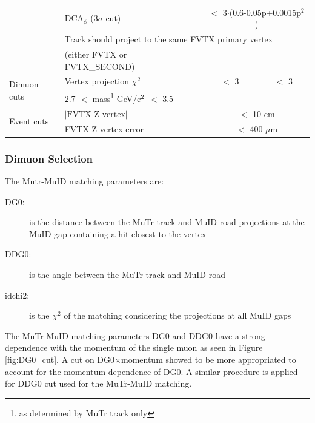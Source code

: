 \documentclass[12pt]{article}
\begin{document}
\begin{table}[!hb]
\begin{tabular}{llcc}
   	& $\textrm{DCA}_{\phi}$ (3$\sigma$ cut) & \multicolumn{2}{c}{$<$ 3$\cdot$(0.6-0.05p+0.0015p$^{2}$) } \\ 
   	& \multicolumn{3}{l}{Track should project to the same FVTX primary vertex }\\
   	& (either FVTX or FVTX\_SECOND) \\ 	
	\hline
    	\multirow{2}{*}{Dimuon cuts} 
	& Vertex projection $\chi^2$ & $<$ 3  & $<$ 3 \\
    	& 2.7 $<$ mass\footnote{as determined by MuTr track only} GeV/$\rm{c}^{2}$ $<$ 3.5 \\\hline
    	\multirow{2}{*}{Event cuts} 
	& $|\textrm{FVTX Z vertex}|$ &   \multicolumn{2}{c}{$<$ 10 cm} \\
    	& FVTX Z vertex error      &   \multicolumn{2}{c}{ $<$ 400 $\mu$m} \\\hline
    \end{tabular}
\end{table}

\pagebreak
\newpage


\subsubsection{Dimuon Selection}
\label{sec:dimuon_selection}

The Mutr-MuID matching parameters are:

\begin{description}
	\item [DG0:] is the distance between the MuTr track and MuID road projections at the MuID gap containing a hit closest to the vertex
	\item [DDG0:] is the angle between the MuTr track and MuID road
	\item [idchi2:] is the $\chi^2$ of the matching considering the projections at all MuID gaps
\end{description}

The MuTr-MuID matching parameters DG0 and DDG0 have a strong dependence with the
momentum of the single muon as seen in Figure \ref{fig:DG0_cut}. A cut on DG0$\times$momentum 
showed to be more appropriated to account for the momentum dependence of DG0. A similar procedure is applied for DDG0 cut used for the MuTr-MuID matching.
 
\end{document}
